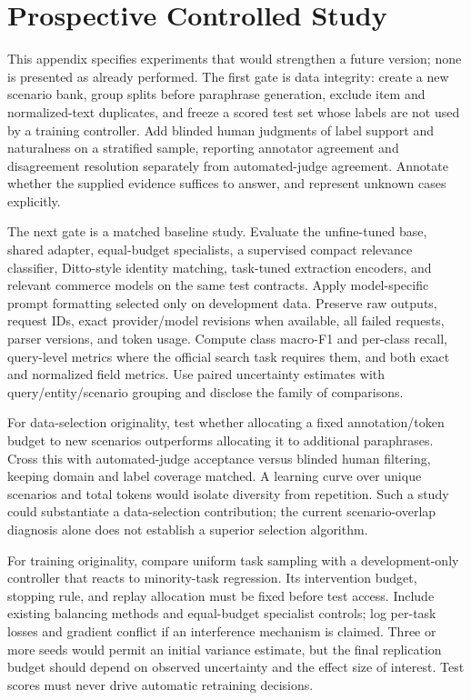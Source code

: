 \section{Prospective Controlled Study}
\label{app:future}
This appendix specifies experiments that would strengthen a future version; none is presented as already performed. The first gate is data integrity: create a new scenario bank, group splits before paraphrase generation, exclude item and normalized-text duplicates, and freeze a scored test set whose labels are not used by a training controller. Add blinded human judgments of label support and naturalness on a stratified sample, reporting annotator agreement and disagreement resolution separately from automated-judge agreement. Annotate whether the supplied evidence suffices to answer, and represent unknown cases explicitly.

The next gate is a matched baseline study. Evaluate the unfine-tuned base, shared adapter, equal-budget specialists, a supervised compact relevance classifier, Ditto-style identity matching, task-tuned extraction encoders, and relevant commerce models on the same test contracts. Apply model-specific prompt formatting selected only on development data. Preserve raw outputs, request IDs, exact provider/model revisions when available, all failed requests, parser versions, and token usage. Compute class macro-F1 and per-class recall, query-level metrics where the official search task requires them, and both exact and normalized field metrics. Use paired uncertainty estimates with query/entity/scenario grouping and disclose the family of comparisons.

For data-selection originality, test whether allocating a fixed annotation/token budget to new scenarios outperforms allocating it to additional paraphrases. Cross this with automated-judge acceptance versus blinded human filtering, keeping domain and label coverage matched. A learning curve over unique scenarios and total tokens would isolate diversity from repetition. Such a study could substantiate a data-selection contribution; the current scenario-overlap diagnosis alone does not establish a superior selection algorithm.

For training originality, compare uniform task sampling with a development-only controller that reacts to minority-task regression. Its intervention budget, stopping rule, and replay allocation must be fixed before test access. Include existing balancing methods and equal-budget specialist controls; log per-task losses and gradient conflict if an interference mechanism is claimed. Three or more seeds would permit an initial variance estimate, but the final replication budget should depend on observed uncertainty and the effect size of interest. Test scores must never drive automatic retraining decisions.

